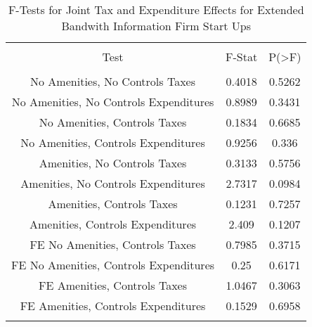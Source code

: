 
\begin{table}[!htbp] \centering 
  \caption{F-Tests for Joint Tax and Expenditure Effects for Extended Bandwith Information Firm Start Ups} 
  \label{51Ftests} 
\begin{tabular}{@{\extracolsep{5pt}} ccc} 
\\[-1.8ex]\hline 
\hline \\[-1.8ex] 
Test & F-Stat & P(\textgreater F) \\ 
\hline \\[-1.8ex] 
No Amenities, No Controls Taxes & 0.4018 & 0.5262 \\ 
No Amenities, No Controls Expenditures & 0.8989 & 0.3431 \\ 
No Amenities, Controls Taxes & 0.1834 & 0.6685 \\ 
No Amenities, Controls Expenditures & 0.9256 & 0.336 \\ 
Amenities, No Controls Taxes & 0.3133 & 0.5756 \\ 
Amenities, No Controls Expenditures & 2.7317 & 0.0984 \\ 
Amenities, Controls Taxes & 0.1231 & 0.7257 \\ 
Amenities, Controls Expenditures & 2.409 & 0.1207 \\ 
FE No Amenities, Controls Taxes & 0.7985 & 0.3715 \\ 
FE No Amenities, Controls Expenditures & 0.25 & 0.6171 \\ 
FE Amenities, Controls Taxes & 1.0467 & 0.3063 \\ 
FE Amenities, Controls Expenditures & 0.1529 & 0.6958 \\ 
\hline \\[-1.8ex] 
\end{tabular} 
\end{table} 
